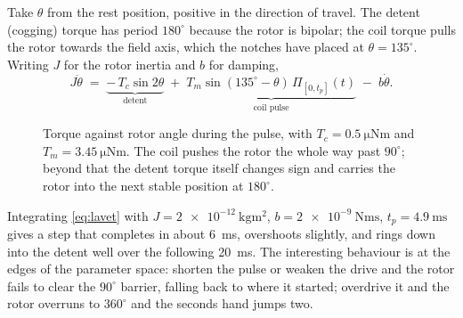 \documentclass[11pt,a4paper]{article}
\begin{document}
Take $\theta$ from the rest position, positive in the direction of travel. The detent (cogging)
torque has period $180^\circ$ because the rotor is bipolar; the coil torque pulls the rotor
towards the field axis, which the notches have placed at $\theta = 135^\circ$. Writing $J$ for
the rotor inertia and $b$ for damping,
\begin{equation}
J\ddot{\theta} \;=\; \underbrace{-\,T_c \sin 2\theta}_{\text{detent}}
\;+\; \underbrace{T_m \sin(135^\circ - \theta)\,\Pi_{[0,t_p]}(t)}_{\text{coil pulse}}
\;-\; b\dot{\theta}.
\label{eq:lavet}
\end{equation}

\begin{figure}[htbp]
\centering
{}
\caption{Torque against rotor angle during the pulse, with $T_c = \SI{0.5}{\micro\newton\metre}$
and $T_m = \SI{3.45}{\micro\newton\metre}$. The coil pushes the rotor the whole way past
$90^\circ$; beyond that the detent torque itself changes sign and carries the rotor into the
next stable position at $180^\circ$.}
\end{figure}

Integrating \eqref{eq:lavet} with $J = \SI{2e-12}{\kilogram\metre\squared}$,
$b = \SI{2e-9}{\newton\metre\second}$, $t_p = \SI{4.9}{\milli\second}$ gives a step that
completes in about \SI{6}{\milli\second}, overshoots slightly, and rings down into the detent
well over the following \SI{20}{\milli\second}. The interesting behaviour is at the edges of the
parameter space: shorten the pulse or weaken the drive and the rotor fails to clear the
$90^\circ$ barrier, falling back to where it started; overdrive it and the rotor overruns to
$360^\circ$ and the seconds hand jumps two.
\end{document}
